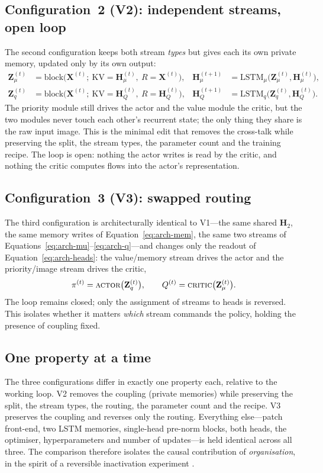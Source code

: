 \subsection{Configuration~2 (V2): independent streams, open loop}
The second configuration keeps both stream \emph{types} but gives each its own private memory, updated only by its own output:
\begin{align}
\mathbf{Z}_{\mu}^{(t)} &= \mathrm{block}\big(\mathbf{X}^{(t)};\ \mathrm{KV}=\mathbf{H}_{\mu}^{(t)},\ R=\mathbf{X}^{(t)}\big), & \mathbf{H}_{\mu}^{(t+1)}&=\mathrm{LSTM}_{\mu}\big(\mathbf{Z}_{\mu}^{(t)},\mathbf{H}_{\mu}^{(t)}\big),\\
\mathbf{Z}_{q}^{(t)} &= \mathrm{block}\big(\mathbf{X}^{(t)};\ \mathrm{KV}=\mathbf{H}_{Q}^{(t)},\ R=\mathbf{H}_{Q}^{(t)}\big), & \mathbf{H}_{Q}^{(t+1)}&=\mathrm{LSTM}_{q}\big(\mathbf{Z}_{q}^{(t)},\mathbf{H}_{Q}^{(t)}\big).
\end{align}
The priority module still drives the actor and the value module the critic, but the two modules never touch each other's recurrent state; the only thing they share is the raw input image. This is the minimal edit that removes the cross-talk while preserving the split, the stream types, the parameter count and the training recipe. The loop is open: nothing the actor writes is read by the critic, and nothing the critic computes flows into the actor's representation.

\subsection{Configuration~3 (V3): swapped routing}
The third configuration is architecturally identical to V1---the same shared $\mathbf{H}_2$, the same memory writes of Equation~\eqref{eq:arch-mem}, the same two streams of Equations~\eqref{eq:arch-mu}--\eqref{eq:arch-q}---and changes only the readout of Equation~\eqref{eq:arch-heads}: the value/memory stream drives the actor and the priority/image stream drives the critic,
\begin{equation}
\pi^{(t)}=\textsc{actor}\big(\mathbf{Z}_{q}^{(t)}\big),\qquad Q^{(t)}=\textsc{critic}\big(\mathbf{Z}_{\mu}^{(t)}\big).
\end{equation}
The loop remains closed; only the assignment of streams to heads is reversed. This isolates whether it matters \emph{which} stream commands the policy, holding the presence of coupling fixed.

\subsection{One property at a time}
The three configurations differ in exactly one property each, relative to the working loop. V2 removes the coupling (private memories) while preserving the split, the stream types, the routing, the parameter count and the recipe. V3 preserves the coupling and reverses only the routing. Everything else---patch front-end, two LSTM memories, single-head pre-norm blocks, both heads, the optimiser, hyperparameters and number of updates---is held identical across all three. The comparison therefore isolates the causal contribution of \emph{organisation}, in the spirit of a reversible inactivation experiment \citep{lovejoy2010inactivation}.

